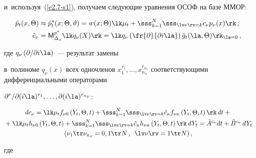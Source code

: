 и~используя~(\ref{e2.7-s1}), получаем следующие уравнения ОСОФ на базе ММОР:

     \begin{align}

\tilde p_t(x, \Theta )&\approx \tilde p_t^*(x; \Theta, \vartheta)= w(x; \Theta) \lk \mu_t+ \sss_{k=1}^N

     \sss_{\lv\nu\rv=k} c_\nu p_\nu(x)\rk\,;\label{e5.1-s1}\\

\tilde c_\nu &= {\sf M}_{\Delta_x}^{p^*} \lk q_\nu (X)\rk = \lk q_\nu \left( 

\fr{\partial }{\partial i\la}\right)

     \tilde g_t(\la, \Theta)\rk_{\la=0}\,,\notag %

     \end{align}

где $q_\nu\left( \partial /\partial i\la\right)$~--- результат замены 

в~полиноме  $q_\nu(x)$ всех одночленов $x_1^{r_1},\ldots

, x_{n_x}^{r_{n_x}}$ соответствующими дифференциальными операторами

 $ \partial^r /\partial (i\la)^{r_1}, \ldots, \partial

(i\la)^{r_{n_x}}$:

    \begin{multline}

    dc_\nu =\lk \mu_t f_{\nu 0} \left(Y_t,\Theta,t\right) +\sss_{k=1}^N \sss_{\lv\nu\rv=k} 

    \tilde c_\kappa f_{\nu\kappa} \left(Y_t,\Theta,t\right)\rk \,dt+{}\\

{}+\lk \mu_t h_{\nu 0} \left(Y_t,\Theta,t\right) +\sss_{k=1}^N \sss_{\lv\kappa\rv=k}

\tilde c_\kappa h_{\nu\kappa} \left(Y_t,\Theta,t\right)\rk \,dY_t= 

\tilde A^{c_\nu} dt +\tilde B^{c_\nu}\, d Y_t

   \\

        (\nu_1\tr \nu_{n_x}= 0,1\tr N\,,\enskip \lv \nu\rv = 1\tr N)\,,

     \label{e5.3-s1}

   \end{multline}

где

